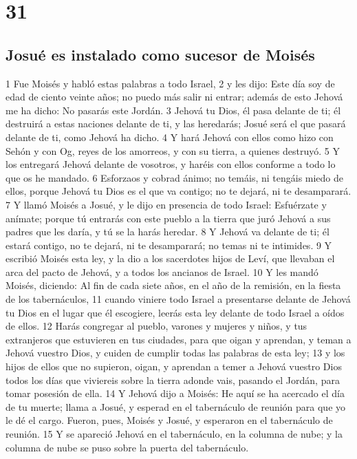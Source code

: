 \chapter{31}

\section{Josué es instalado como sucesor de Moisés}

1 Fue Moisés y habló estas palabras a todo Israel,
2 y les dijo: Este día soy de edad de ciento veinte años; no puedo más salir ni entrar; además de esto Jehová me ha dicho: No pasarás este Jordán.
3 Jehová tu Dios, él pasa delante de ti; él destruirá a estas naciones delante de ti, y las heredarás; Josué será el que pasará delante de ti, como Jehová ha dicho.
4 Y hará Jehová con ellos como hizo con Sehón y con Og, reyes de los amorreos, y con su tierra, a quienes destruyó. 
5 Y los entregará Jehová delante de vosotros, y haréis con ellos conforme a todo lo que os he mandado.
6 Esforzaos y cobrad ánimo; no temáis, ni tengáis miedo de ellos, porque Jehová tu Dios es el que va contigo; no te dejará, ni te desamparará.
7 Y llamó Moisés a Josué, y le dijo en presencia de todo Israel: Esfuérzate y anímate; porque tú entrarás con este pueblo a la tierra que juró Jehová a sus padres que les daría, y tú se la harás heredar.
8 Y Jehová va delante de ti; él estará contigo, no te dejará, ni te desamparará; no temas ni te intimides.
9 Y escribió Moisés esta ley, y la dio a los sacerdotes hijos de Leví, que llevaban el arca del pacto de Jehová, y a todos los ancianos de Israel. 
10 Y les mandó Moisés, diciendo: Al fin de cada siete años, en el año de la remisión, en la fiesta de los tabernáculos, 
11 cuando viniere todo Israel a presentarse delante de Jehová tu Dios en el lugar que él escogiere, leerás esta ley delante de todo Israel a oídos de ellos.
12 Harás congregar al pueblo, varones y mujeres y niños, y tus extranjeros que estuvieren en tus ciudades, para que oigan y aprendan, y teman a Jehová vuestro Dios, y cuiden de cumplir todas las palabras de esta ley;
13 y los hijos de ellos que no supieron, oigan, y aprendan a temer a Jehová vuestro Dios todos los días que viviereis sobre la tierra adonde vais, pasando el Jordán, para tomar posesión de ella.
14 Y Jehová dijo a Moisés: He aquí se ha acercado el día de tu muerte; llama a Josué, y esperad en el tabernáculo de reunión para que yo le dé el cargo. Fueron, pues, Moisés y Josué, y esperaron en el tabernáculo de reunión.
15 Y se apareció Jehová en el tabernáculo, en la columna de nube; y la columna de nube se puso sobre la puerta del tabernáculo.

